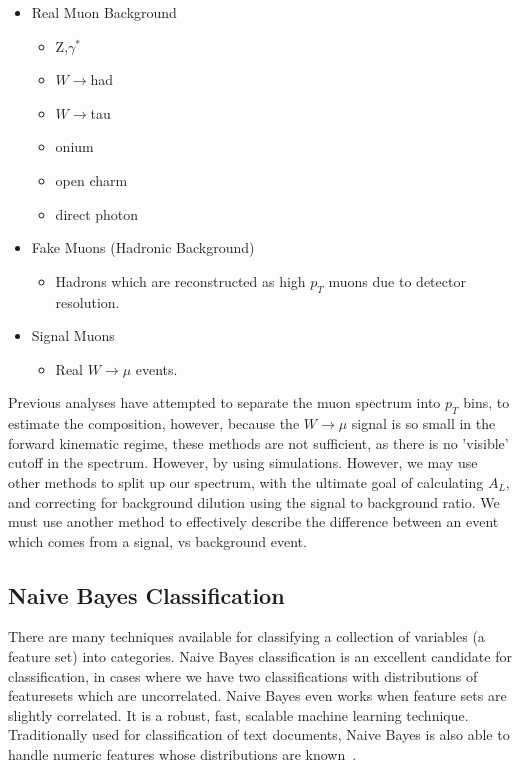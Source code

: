 \begin{itemize}
	\item Real Muon Background
		\begin{itemize}
			\item Z,$\gamma^*$
			\item $W\rightarrow$had
			\item $W\rightarrow$tau
		  \item onium
			\item open charm
			\item direct photon
		\end{itemize}
	\item Fake Muons (Hadronic Background)
		\begin{itemize}	
			\item Hadrons which are reconstructed as high $p_T$ muons due to detector
			resolution.
		\end{itemize}
	\item Signal Muons
		\begin{itemize}	
			\item Real $W\rightarrow\mu$ events.
		\end{itemize}
\end{itemize}

Previous analyses have attempted to separate the muon spectrum into $p_T$ bins,
to estimate the composition, however, because the $W\rightarrow\mu$ signal is so
small in the forward kinematic regime, these methods are not sufficient, as
there is no 'visible' cutoff in the spectrum. However, by using simulations.
However, we may use other methods to split up our spectrum, with the ultimate
goal of calculating $A_L$, and correcting for background dilution using the
signal to background ratio. We must use another method to effectively describe
the difference between an event which comes from a signal, vs background event.

\subsection{Naive Bayes Classification}
There are many techniques available for classifying a collection of variables
(a feature set) into categories. Naive Bayes classification is an excellent
candidate for classification, in cases where we have two classifications with
distributions of featuresets which are uncorrelated. Naive Bayes even works when
feature sets are slightly correlated. It is a robust, fast, scalable machine
learning technique. Traditionally used for classification of text documents,
Naive Bayes is also able to handle numeric features whose distributions are
known~\cite{Collins2013}.

